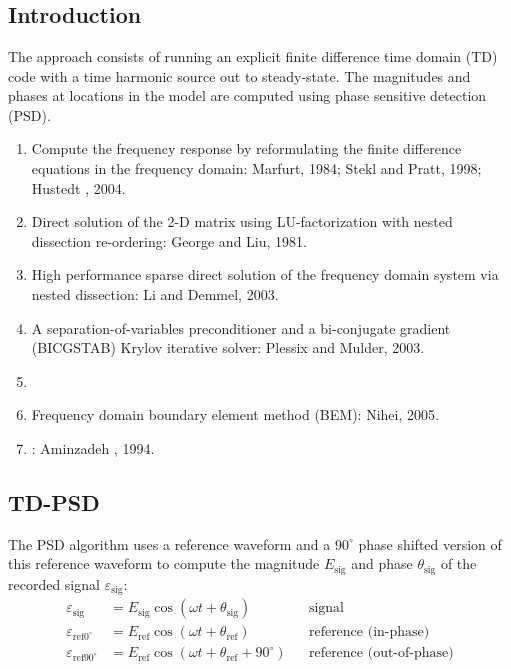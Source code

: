 \renewcommand{\pmk}{Nihei\_2007\_GJI\_TD phase sensitive detection}
\renewcommand{\prf}{Others/\pmk.pdf}
\renewcommand{\pti}{Frequency response modelling of seismic waves using
finite difference time domain with phase sensitive detection (TD-PSD)}
\renewcommand{\pay}{Kurt T. Nihei and Xiaoye Li, 2007}
\renewcommand{\pjo}{Geophys. J. Int.}
\renewcommand{\pda}{2019/8/17 Sun.}

\section{\pinfo}
\subsection{Introduction}
The approach consists of running an explicit finite difference time domain (TD)
code with a time harmonic source out to steady-state.
The magnitudes and phases at locations in the model are computed using
phase sensitive detection (PSD).

\begin{enumerate}[\hspace{10mm}*]
  \item Compute the frequency response by reformulating the finite difference
    equations in the frequency domain: Marfurt, 1984; Stekl and Pratt, 1998;
    Hustedt \etal, 2004.
  \item Direct solution of the 2-D matrix using LU-factorization with nested
    dissection re-ordering: George and Liu, 1981.
  \item High performance sparse direct solution of the frequency domain system
    via nested dissection: Li and Demmel, 2003.
  \item A separation-of-variables preconditioner and a bi-conjugate gradient
    (BICGSTAB) Krylov iterative solver: Plessix and Mulder, 2003.
  \item \sline
  \item Frequency domain boundary element method (BEM): Nihei, 2005.
  \item {}
    : 
    Aminzadeh \etal, 1994.
\end{enumerate}

\subsection{TD-PSD}
The PSD algorithm uses a reference waveform and a $90^\circ$ phase shifted
version of this reference waveform to compute the magnitude $E_\text{sig}$ and
phase $\theta_\text{sig}$ of the recorded signal $\varepsilon_\text{sig}$:
\begin{align*}
  \varepsilon_\text{sig} & = E_\text{sig} \cos(\omega t + \theta_\text{sig})
    & & \text{signal} \\
  \varepsilon_{\text{ref0}^\circ} & = E_\text{ref} \cos(\omega t
    + \theta_\text{ref}) & & \text{reference (in-phase)} \\
  \varepsilon_{\text{ref90}^\circ} & = E_\text{ref} \cos(\omega t
    + \theta_\text{ref} + 90^\circ) & & \text{reference (out-of-phase)}
\end{align*}

